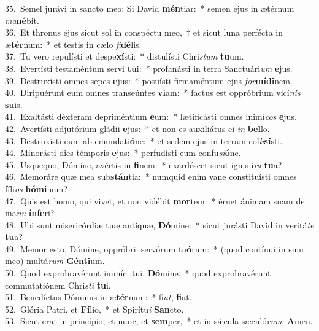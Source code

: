 {35.~}Semel jurávi in sancto meo: Si David \textbf{mén}tiar:~* semen ejus in ætérnum \textit{ma}\textbf{né}bit.\\
{36.~}Et thronus ejus sicut sol in conspéctu meo,~† et sicut luna perfécta in æ\textbf{tér}num:~* et testis in cælo \textit{fi}\textbf{dé}lis.\\
{37.~}Tu vero repulísti et despe\textbf{xí}sti:~* distulísti Chri\textit{stum} \textbf{tu}um.\\
{38.~}Evertísti testaméntum servi \textbf{tu}i:~* profanásti in terra Sanctuári\textit{um} \textbf{e}jus.\\
{39.~}Destruxísti omnes sepes \textbf{e}jus:~* posuísti firmaméntum ejus \textit{for}\textbf{mí}\textbf{di}nem.\\
{40.~}Diripuérunt eum omnes transeúntes \textbf{vi}am:~* factus est oppróbrium vicí\textit{nis} \textbf{su}is.\\
{41.~}Exaltásti déxteram depriméntium \textbf{e}um:~* lætificásti omnes inimí\textit{cos} \textbf{e}jus.\\
{42.~}Avertísti adjutórium gládii \textbf{e}jus:~* et non es auxiliátus ei \textit{in} \textbf{bel}lo.\\
{43.~}Destruxísti eum ab emundati\textbf{ó}ne:~* et sedem ejus in terram col\textit{li}\textbf{sí}sti.\\
{44.~}Minorásti dies témporis \textbf{e}jus:~* perfudísti eum confu\textit{si}\textbf{ó}ne.\\
{45.~}Usquequo, Dómine, avértis in \textbf{fi}nem:~* exardéscet sicut ignis i\textit{ra} \textbf{tu}a?\\
{46.~}Memoráre quæ mea sub\textbf{stán}tia:~* numquid enim vane constituísti omnes fíli\textit{os} \textbf{hó}\textbf{mi}num?\\
{47.~}Quis est homo, qui vivet, et non vidébit \textbf{mor}tem:~* éruet ánimam suam de ma\textit{nu} \textbf{ín}\textbf{fe}ri?\\
{48.~}Ubi sunt misericórdiæ tuæ antíquæ, \textbf{Dó}mine:~* sicut jurásti David in veritá\textit{te} \textbf{tu}a?\\
{49.~}Memor esto, Dómine, oppróbrii servórum tu\textbf{ó}rum:~* (quod contínui in sinu meo) multá\textit{rum} \textbf{Gén}\textbf{ti}um.\\
{50.~}Quod exprobravérunt inimíci tui, \textbf{Dó}mine,~* quod exprobravérunt commutatiónem Chri\textit{sti} \textbf{tu}i.\\
{51.~}Benedíctus Dóminus in æ\textbf{tér}num:~* fi\textit{at}, \textbf{fi}at.\\
{52.~}Glória Patri, et \textbf{Fí}lio,~* et Spirítu\textit{i} \textbf{San}cto.\\
{53.~}Sicut erat in princípio, et nunc, et \textbf{sem}per,~* et in sǽcula sæculó\textit{rum}. \textbf{A}men.\\
